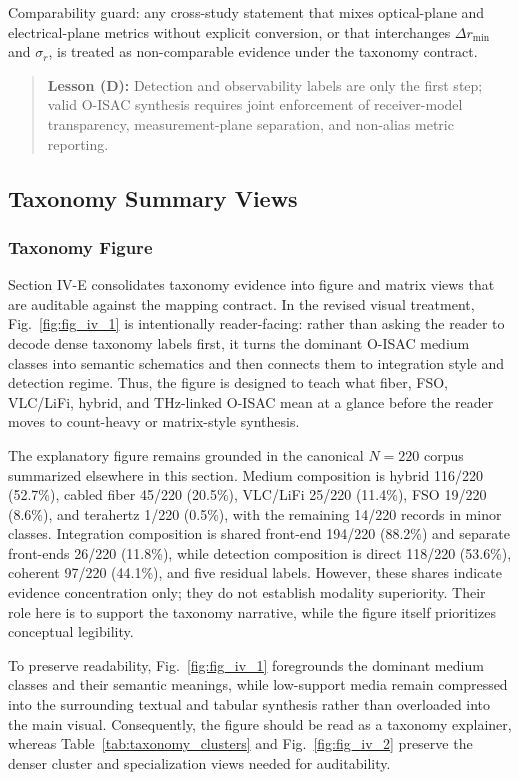 Comparability guard: any cross-study statement that mixes optical-plane and electrical-plane metrics without explicit conversion, or that interchanges $\Delta r_{\min}$ and $\sigma_r$, is treated as non-comparable evidence under the taxonomy contract.

\begin{quote}
\textbf{Lesson (D):} Detection and observability labels are only the first step; valid O-ISAC synthesis requires joint enforcement of receiver-model transparency, measurement-plane separation, and non-alias metric reporting.
\end{quote}

\subsection{Taxonomy Summary Views}

\subsubsection{Taxonomy Figure}
Section IV-E consolidates taxonomy evidence into figure and matrix views that are auditable against the mapping contract. In the revised visual treatment, Fig.~\ref{fig:fig_iv_1} is intentionally reader-facing: rather than asking the reader to decode dense taxonomy labels first, it turns the dominant O-ISAC medium classes into semantic schematics and then connects them to integration style and detection regime. Thus, the figure is designed to teach what fiber, FSO, VLC/LiFi, hybrid, and THz-linked O-ISAC mean at a glance before the reader moves to count-heavy or matrix-style synthesis.

The explanatory figure remains grounded in the canonical $N=220$ corpus summarized elsewhere in this section. Medium composition is hybrid 116/220 (52.7\%), cabled fiber 45/220 (20.5\%), VLC/LiFi 25/220 (11.4\%), FSO 19/220 (8.6\%), and terahertz 1/220 (0.5\%), with the remaining 14/220 records in minor classes. Integration composition is shared front-end 194/220 (88.2\%) and separate front-ends 26/220 (11.8\%), while detection composition is direct 118/220 (53.6\%), coherent 97/220 (44.1\%), and five residual labels. However, these shares indicate evidence concentration only; they do not establish modality superiority. Their role here is to support the taxonomy narrative, while the figure itself prioritizes conceptual legibility.

To preserve readability, Fig.~\ref{fig:fig_iv_1} foregrounds the dominant medium classes and their semantic meanings, while low-support media remain compressed into the surrounding textual and tabular synthesis rather than overloaded into the main visual. Consequently, the figure should be read as a taxonomy explainer, whereas Table~\ref{tab:taxonomy_clusters} and Fig.~\ref{fig:fig_iv_2} preserve the denser cluster and specialization views needed for auditability.

